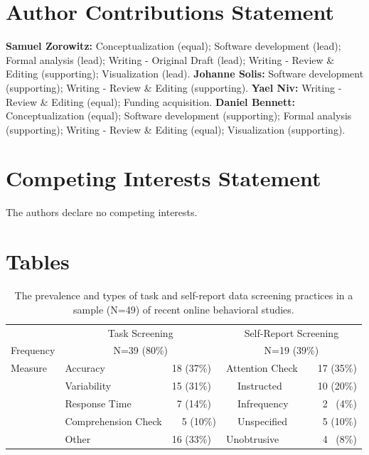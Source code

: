\documentclass[a4paper,notitlepage,12pt]{article}
\begin{document}
\begin{refsection}[main]
\section*{Author Contributions Statement}

\textbf{Samuel Zorowitz:} Conceptualization (equal); Software development (lead); Formal analysis (lead); Writing - Original Draft (lead); Writing - Review \& Editing (supporting); Visualization (lead). \textbf{Johanne Solis:} Software development (supporting); Writing - Review \& Editing (supporting). \textbf{Yael Niv:} Writing - Review \& Editing (equal); Funding acquisition. \textbf{Daniel Bennett:} Conceptualization (equal); Software development (supporting); Formal analysis (supporting); Writing - Review \& Editing (equal); Visualization (supporting).

\section*{Competing Interests Statement}

The authors declare no competing interests.

\clearpage
\section*{Tables}

\begin{table}[h]
    \centering
    \small
    \setlength{\tabcolsep}{8pt}
    \begin{tabular}{lllrllr}
        \toprule
        & \multicolumn{2}{c}{Task Screening} & \multicolumn{4}{c}{Self-Report Screening} \\
        \cmidrule(lr){2-3} \cmidrule(lr){4-7}
        Frequency & \multicolumn{2}{c}{N=39 (80\%)} & \multicolumn{4}{c}{N=19 (39\%)} \\
        \midrule
        Measure & Accuracy & 18 (37\%) & \multicolumn{2}{l}{Attention Check} & & 17 (35\%) \\
        & Variability & 15 (31\%) & & Instructed & & 10 (20\%) \\
        & Response Time & \ 7 (14\%) & & Infrequency & & 2 \, (4\%) \\
        & Comprehension Check & \ \ 5 (10\%) & & Unspecified & & 5 (10\%) \\
        & Other & 16 (33\%) & \multicolumn{2}{l}{Unobtrusive} & & \ 4 \, (8\%) \\
        \bottomrule
    \end{tabular}
    \captionsetup{width=0.88\textwidth}
    \caption{The prevalence and types of task and self-report data screening practices in a sample (N=49) of recent online behavioral studies.}
    \label{tab:screening}
\end{table}


\end{refsection}
\end{document}
